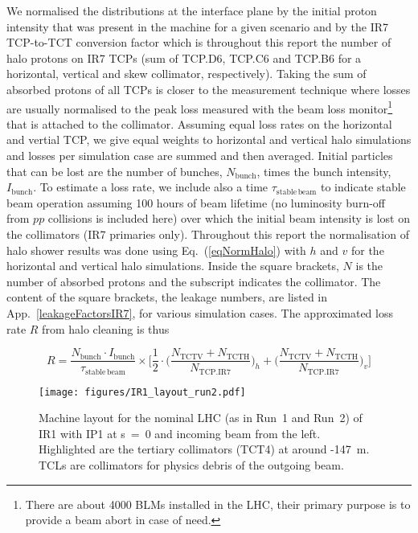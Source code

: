 We normalised the distributions at the interface plane by the initial proton intensity that was present in the machine for a given scenario and by the IR7 TCP-to-TCT conversion factor which is throughout this report the number of halo protons on IR7 TCPs (sum of TCP.D6, TCP.C6 and TCP.B6 for a horizontal, vertical and skew collimator, respectively). Taking the sum of absorbed protons of all TCPs is closer to the measurement technique where losses are usually normalised to the peak loss measured with the beam loss monitor\footnote{There are about 4000 BLMs installed in the LHC, their primary purpose is to provide a beam abort in case of need.} that is attached to the collimator. Assuming equal loss rates on the horizontal and vertial TCP, we give equal weights to horizontal and vertical halo simulations and losses per simulation case are summed and then averaged. Initial particles that can be lost are the number of bunches, $N_{\mathrm{bunch}}$, times the bunch intensity, $I_{\mathrm{bunch}}$. To estimate a loss rate, we include also a time $\tau_\mathrm{stable \, beam}$ to indicate stable beam operation assuming 100 hours of beam lifetime (no luminosity burn-off from $pp$ collisions is included here) over which the initial beam intensity is lost on the collimators (IR7 primaries only). Throughout this report the normalisation of halo shower results was done using Eq.~(\ref{eqNormHalo}) with $h$ and $v$ for the horizontal and vertical halo simulations. Inside the square brackets, $N$ is the number of absorbed protons and the subscript indicates the collimator. The content of the square brackets, the leakage numbers, are listed in App.~\ref{leakageFactorsIR7}, for various simulation cases. The approximated loss rate $R$ from halo cleaning is thus

\begin{equation} \label{eqNormHalo}
R = \frac{N_{\mathrm{bunch}} \cdot I_{\mathrm{bunch}}}{\tau_{\mathrm{stable \, beam}}} \times \Bigg[ \frac{1}{2} \cdot \Big( \frac{N_{\mathrm{TCTV}} + N_{\mathrm{TCTH}}}{N_{\mathrm{TCP.IR7}}}\Big)_{h} + \Big( \frac{N_{\mathrm{TCTV}} + N_{\mathrm{TCTH}}}{N_{\mathrm{TCP.IR7}}} \Big)_{v}  \Bigg]
\end{equation}


\begin{figure}%
\begin{center}
\texttt{[image: figures/IR1\_layout\_run2.pdf]}
\end{center}
\vspace{-0.6cm}
 \caption{Machine layout for the nominal LHC (as in Run~1 and Run~2) of IR1 with IP1 at s~=~0 and incoming beam from the left. Highlighted are the tertiary collimators (TCT4) at around -147~m. TCLs are collimators for physics debris of the outgoing beam.
  \label{nominalLHC_layout}}
\end{figure}


